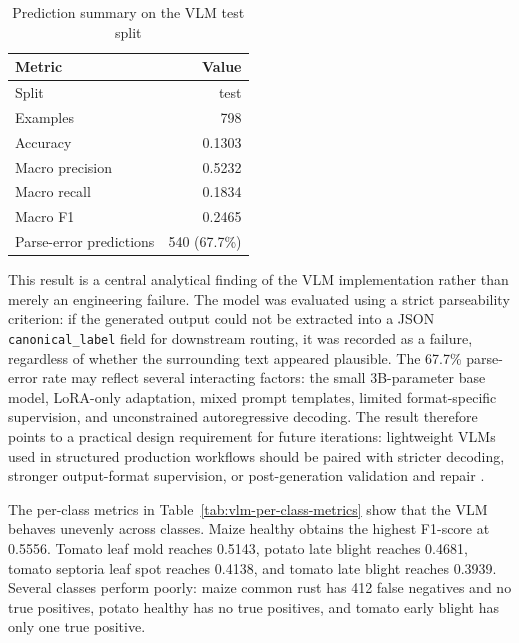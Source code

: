 \begin{table}[H]
  \centering
  \caption{Prediction summary on the VLM test split}
  \label{tab:vlm-prediction-summary}
  \begin{tabular}{lr}
    \toprule
    \textbf{Metric} & \textbf{Value} \\
    \midrule
    Split & test \\
    Examples & 798 \\
    Accuracy & 0.1303 \\
    Macro precision & 0.5232 \\
    Macro recall & 0.1834 \\
    Macro F1 & 0.2465 \\
    Parse-error predictions & 540 (67.7\%) \\
    \bottomrule
  \end{tabular}
\end{table}

This result is a central analytical finding of the VLM implementation rather than merely an
engineering failure. The model was evaluated using a strict parseability criterion: if the
generated output could not be extracted into a JSON \texttt{canonical\_label} field for
downstream routing, it was recorded as a failure, regardless of whether the surrounding text
appeared plausible. The 67.7\% parse-error rate may reflect several interacting factors: the
small 3B-parameter base model, LoRA-only adaptation, mixed prompt templates, limited
format-specific supervision, and unconstrained autoregressive decoding. The result therefore
points to a practical design requirement for future iterations: lightweight VLMs used in
structured production workflows should be paired with stricter decoding, stronger output-format
supervision, or post-generation validation and repair \parencite{paleyes2022MLSystemsChallenges}.


The per-class metrics in Table~\ref{tab:vlm-per-class-metrics} show that the VLM behaves unevenly
across classes. Maize healthy obtains the highest F1-score at 0.5556. Tomato leaf mold reaches
0.5143, potato late blight reaches 0.4681, tomato septoria leaf spot reaches 0.4138, and tomato
late blight reaches 0.3939. Several classes perform poorly: maize common rust has 412 false
negatives and no true positives, potato healthy has no true positives, and tomato early blight has
only one true positive.

